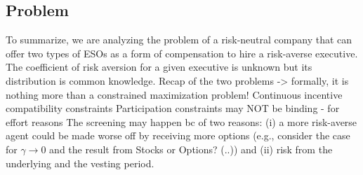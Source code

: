 \subsection{Problem}
To summarize, we are analyzing the problem of a risk-neutral company that can offer two types of ESOs as a form of compensation to hire a risk-averse executive. The coefficient of risk aversion for a given executive is unknown but its distribution is common knowledge.
Recap of the two problems
-> formally, it is nothing more than a constrained maximization problem!
Continuous incentive compatibility constraints
Participation constraints may NOT be binding - for effort reasons
The screening may happen bc of two reasons: (i) a more risk-averse agent could be made worse off by receiving more options (e.g., consider the case for $\gamma \rightarrow 0$ and the result from Stocks or Options? (..)) and (ii) risk from the underlying and the vesting period.

